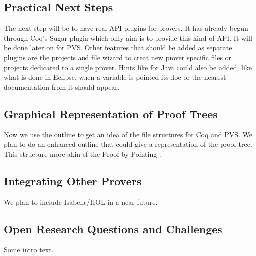 \documentclass{llncs}
\begin{document}
\subsection{Practical Next Steps}
\label{subsec:practical-next-steps}

The next step will be to have real API plugins for provers. 
It has already begun through Coq's Sugar plugin which only aim 
is to provide this kind of API.
It will be done later on for PVS. Other features that should be added
as separate plugins are the projects and file wizard to creat 
new prover specific files or projects dedicated to a single prover.
Hints like for Java could also be added, like what is done in Eclipse, 
when a variable is pointed its doc or the nearest documentation 
from it should appear. 


\subsection{Graphical Representation of Proof Trees}
\label{subsec:graph-repr-proof}

Now we use the outline to get an idea of the file structures for Coq and PVS.
We plan to do an enhanced outline that could give a representation
of the proof tree. This structure more akin of the Proof by Pointing
\cite{bertot94proof}.


\subsection{Integrating Other Provers}
\label{subsec:integr-other-prov}

We plan to include Isabelle/HOL in a near future.

\subsection{Open Research Questions and Challenges}
\label{subsec:open-rese-quest}

Some intro text.



%


\end{document}
